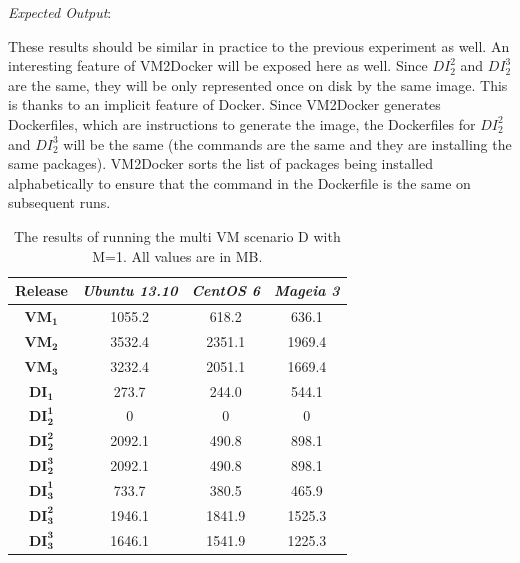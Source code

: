 \begin{enumerate}

\textit{Expected Output}:


These results should be similar in practice to the previous experiment as well. An interesting feature of VM2Docker will be exposed here as well. Since $DI_2^2$ and $DI_2^3$ are the same, they will be only represented once on disk by the same image. This is thanks to an implicit feature of Docker. Since VM2Docker generates Dockerfiles, which are instructions to generate the image, the Dockerfiles for $DI_2^2$ and $DI_2^3$ will be the same (the commands are the same and they are installing the same packages). VM2Docker sorts the list of packages being installed alphabetically to ensure that the command in the Dockerfile is the same on subsequent runs. 

\begin{table}[h]
\centering

    \begin{tabular}{| c | c | c | c|}
    \hline
    \bfseries Release & \itshape Ubuntu 13.10 & \itshape CentOS 6 & \itshape Mageia 3\\ \hline
\bfseries $\boldsymbol{VM_1}$ & 1055.2 & 618.2 & 636.1\\ \hline
\bfseries $\boldsymbol{VM_2}$ & 3532.4 & 2351.1 & 1969.4\\ \hline
\bfseries $\boldsymbol{VM_3}$ &  3232.4 & 2051.1 & 1669.4\\ \hline \hline
    \bfseries $\boldsymbol{DI_1}$ & 273.7 & 244.0 & 544.1\\ \hline
    \bfseries $\boldsymbol{DI_2^1}$ & 0 & 0 & 0\\ \hline 
\bfseries $\boldsymbol{DI_2^2}$ & 2092.1 & 490.8 & 898.1\\ \hline 
\bfseries $\boldsymbol{DI_2^3}$ & 2092.1 & 490.8 & 898.1\\ \hline 
\bfseries $\boldsymbol{DI_3^1}$  & 733.7 & 380.5 & 465.9\\ \hline 
\bfseries $\boldsymbol{DI_3^2}$ & 1946.1 & 1841.9 & 1525.3\\ \hline 
\bfseries $\boldsymbol{DI_3^3}$ & 1646.1 & 1541.9 & 1225.3\\ \hline 
    \end{tabular}
\caption{The results of running the multi VM scenario D with M=1. All values are in MB.}
\label{table:multiscenariod}
\end{table}


\end{enumerate}
